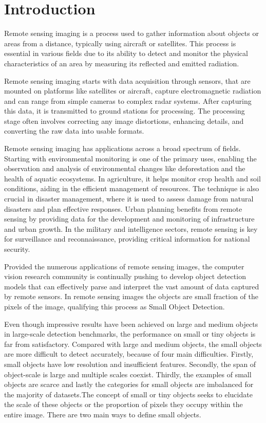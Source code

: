 \chapter{Introduction}

Remote sensing imaging is a process used to gather information about objects or areas from a distance, typically using aircraft or satellites. 
This process is essential in various fields due to its ability to detect and monitor the physical characteristics of an area by measuring its 
reflected and emitted radiation.

Remote sensing imaging starts with data acquisition through sensors, that are mounted on platforms like satellites or aircraft, capture 
electromagnetic radiation and can range from simple cameras to complex radar systems. After capturing this data, it is transmitted to ground 
stations for processing. The processing stage often involves correcting any image distortions, enhancing details, and converting the raw data 
into usable formats. 

Remote sensing imaging has applications across a broad spectrum of fields. Starting with environmental monitoring is one of the primary uses, enabling the 
observation and analysis of environmental changes like deforestation and the health of aquatic ecosystems. In agriculture, it helps monitor 
crop health and soil conditions, aiding in the efficient management of resources. The technique is also crucial in disaster management, where it 
is used to assess damage from natural disasters and plan effective responses. Urban planning benefits from remote sensing by providing data for 
the development and monitoring of infrastructure and urban growth. In the military and intelligence sectors, remote sensing is key for surveillance and 
reconnaissance, providing critical information for national security.

Provided the numerous applications of remote sensing images, the computer vision research community is continually pushing to develop object detection models 
that can effectively parse and interpret the vast amount of data captured by remote sensors. In remote sensing images the objects are small fraction of 
the pixels of the image, qualifying this process as Small Object Detection.

Even though impressive results have been achieved on large and medium objects in large-scale detection benchmarks, the performance on small or tiny objects 
is far from satisfactory. Compared with large and medium objects, the small objects are more difficult to detect accurately, because of four main difficulties.
Firstly, small objects have low resolution and insufficient features. Secondly, the span of object-scale is large and multiple scales coexist. Thirdly, the 
examples of small objects are scarce and lastly the categories for small objects are imbalanced for the majority of datasets.The concept of small or tiny objects 
seeks to elucidate the scale of these objects or the proportion of pixels they occupy within the entire image. There are two main ways to define small objects. 

